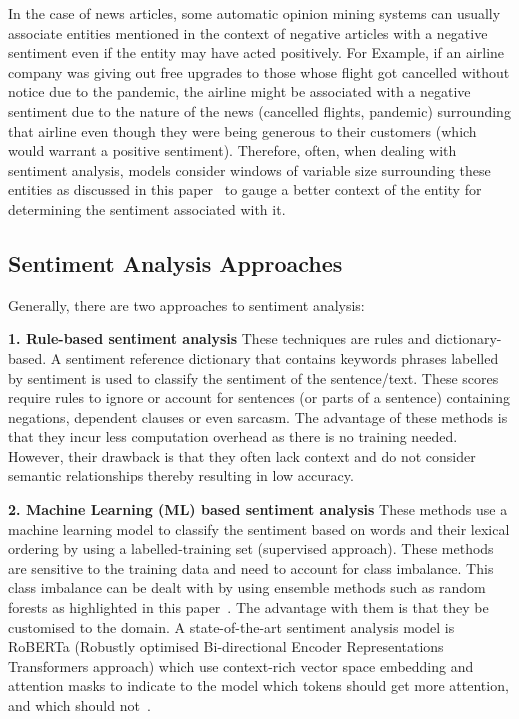 In the case of news articles, some automatic opinion mining systems can usually associate entities mentioned in the context of negative articles with a negative sentiment even if the entity may have acted positively. For Example, if an airline company was giving out free upgrades to those whose flight got cancelled without notice due to the pandemic, the airline might be associated with a negative sentiment due to the nature of the news (cancelled flights, pandemic) surrounding that airline even though they were being generous to their customers (which would warrant a positive sentiment). Therefore, often, when dealing with sentiment analysis, models consider windows of variable size surrounding these entities as discussed in this paper~\cite{20_balahur2013sentiment} to gauge a better context of the entity for determining the sentiment associated with it.

\newpage
\subsection{Sentiment Analysis Approaches}

Generally, there are two approaches to sentiment analysis: 

\textbf{1. Rule-based sentiment analysis}
These techniques are rules and dictionary-based. A sentiment reference dictionary that contains keywords phrases labelled by sentiment is used to classify the sentiment of the sentence/text. These scores require rules to ignore or account for sentences (or parts of a sentence) containing negations, dependent clauses or even sarcasm. The advantage of these methods is that they incur less  computation overhead as there is no training needed. However, their drawback is that they often lack context and do not consider semantic relationships thereby resulting in low accuracy. 

\textbf{2. Machine Learning (ML) based sentiment analysis}
These methods use a machine learning model to classify the sentiment based on words and their lexical ordering by using a labelled-training set (supervised approach). These methods are sensitive to the training data and need to account for class imbalance. This class imbalance can be dealt with by using ensemble methods such as random forests as highlighted in this paper~\cite{18_kanakaraj2015nlp}. The advantage with them is that they be customised to the domain. A state-of-the-art sentiment analysis model is RoBERTa (Robustly optimised Bi-directional Encoder Representations Transformers approach) which use context-rich vector space embedding and attention masks to indicate to the model which tokens should get more attention, and which should not~\cite{roberta}.

